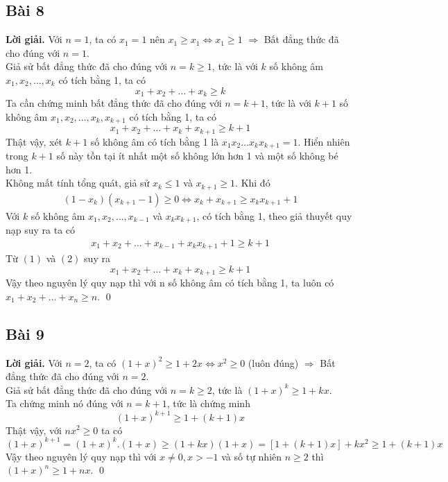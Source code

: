 \documentclass[a4paper,14pt]{article}
\begin{document}
    \subsection{Bài 8}
        \textbf{Lời giải.}
            Với $n=1$, ta có $x_1=1$ nên $x_1\geqslant x_1 \Leftrightarrow x_1\geqslant 1$ $\Rightarrow$ Bất đẳng thức đã cho đúng với $n=1$. \\
            Giả sử bất đẳng thức đã cho đúng với $n=k\geqslant 1$, tức là với $k$ số không âm $x_1,x_2,\ldots,x_k$ có tích bằng 1, ta có
                \[
                    x_1+x_2+\ldots+x_k\geqslant k
                \]
            Ta cần chứng minh bất đẳng thức đã cho đúng với $n=k+1$, tức là với $k+1$ số không âm $x_1,x_2,\ldots,x_k,x_{k+1}$ có tích bằng 1, ta có
                \[
                    x_1+x_2+\ldots+x_k+x_{k+1}\geqslant k+1
                \]
            Thật vậy, xét $k+1$ số không âm có tích bằng 1 là $x_1x_2\ldots x_kx_{k+1}=1$. Hiển nhiên trong $k+1$ số này tồn tại ít nhất một số không lớn hơn 1 và một số không bé hơn 1. \\
            Không mất tính tổng quát, giả sử $x_k\leqslant 1$ và $x_{k+1}\geqslant 1$. Khi đó 
                \begin{align}
                    (1-x_k)(x_{k+1}-1)\geqslant 0 \Leftrightarrow x_k+x_{k+1}\geqslant x_kx_{k+1}+1\tag{1}
                \end{align}
            Với $k$ số không âm $x_1,x_2,\ldots,x_{k-1}$ và $x_kx_{k+1}$, có tích bằng 1, theo giả thuyết quy nạp suy ra ta có
                \begin{align}
                    x_1+x_2+\ldots+x_{k-1}+x_kx_{k+1}+1\geqslant k+1 \tag{2}
                \end{align}
            Từ $(1)$ và $(2)$ suy ra
                \[
                    x_1+x_2+\ldots+x_k+x_{k+1}\geqslant k+1
                \]
            Vậy theo nguyên lý quy nạp thì với n số không âm có tích bằng 1, ta luôn có $x_1+x_2+\ldots+x_n\geqslant n$.
        \qed
    \subsection{Bài 9}
        \textbf{Lời giải.}
            Với $n=2$, ta có $(1+x)^2\geqslant 1+2x \Leftrightarrow x^2\geqslant0$ (luôn đúng) $\Rightarrow$ Bất đẳng thức đã cho đúng với $n=2$.\\
            Giả sử bất đẳng thức đã cho đúng với $n=k\geqslant2$, tức là $(1+x)^k\geqslant 1+kx$.\\
            Ta chứng minh nó đúng với $n=k+1$, tức là chứng minh
                $$(1+x)^{k+1}\geqslant 1+(k+1)x$$
            Thật vậy, với $nx^2\geqslant0$ ta có
            \[
                (1+x)^{k+1}=(1+x)^k.(1+x)\geqslant(1+kx)(1+x)=[1+(k+1)x]+kx^2\geqslant1+(k+1)x
            \]
            Vậy theo nguyên lý quy nạp thì với $x\neq 0,x>-1$ và số tự nhiên $n\geqslant2$ thì $(1+x)^n\geqslant 1+nx$.
        \qed
\end{document}
